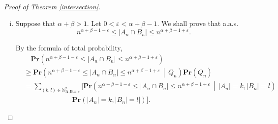 \documentclass[10pt,a4paper]{amsart}
\def\Pr{\mathbf{Pr}}
\newcommand{\bs}{\boldsymbol}
\newcommand\esp[1]{\mathbb{E}\left( #1 \right)}
\newcommand{\tendvers}{\xrightarrow[n\to\infty]{}}
\newcommand{\vide}{\textup{\O}}
\begin{document}
\begin{proof}[Proof of Theorem \ref{intersection}]
\begin{enumerate}[(i)]
        For any $(k,l)\in \mathbb{N}^2_{\bs A,\bs B, n, \varepsilon}$, by Lemma \ref{concentration uniform} (i)
        \[\begin{split}
        \esp{|A_n \cap B_n|\,\middle|\,|A_n|=k,|B_n| = l}
        & = \esp{|A_n \cap B_n|\,\middle|\,|A_n|=n^{\alpha'},|B_n| = n^{\beta'}}\\
        & \leq n^{\alpha'+\beta'-1} \leq n^{\alpha+\beta+2/3\varepsilon-1}\leq n^{-1/3\varepsilon}. 
        \end{split}\]
        Hence
        \[\Pr(A_n\cap B_n\neq\vide) \leq n^{-1/3\varepsilon}\Pr(Q_n)+\Pr(\overline{Q_n})\tendvers 0.\]
        
        \item Suppose that $\alpha+\beta>1$. Let $0<\varepsilon<\alpha+\beta-1$. We shall prove that a.a.s.
        \[n^{\alpha+\beta-1-\varepsilon}\leq|A_n\cap B_n|\leq n^{\alpha+\beta-1+\varepsilon}.\]

        By the formula of total probability,
        \[ \begin{split}&\quad \Pr(n^{\alpha+\beta-1-\varepsilon} \leq |A_n\cap B_n| \leq n^{\alpha+\beta-1+\varepsilon})\\
        & \geq \Pr\left(n^{\alpha+\beta-1-\varepsilon}\leq |A_n\cap B_n| \leq n^{\alpha+\beta-1+\varepsilon}\,\middle|\,Q_n\right)\Pr(Q_n)\\
        & = \sum_{(k,l)\in\mathbb{N}^2_{\bs A,\bs B, n, \varepsilon}} \Big[ \Pr\left(n^{\alpha+\beta-1-\varepsilon}\leq |A_n\cap B_n| \leq n^{\alpha+\beta-1+\varepsilon}\,\middle|\,|A_n|=k,|B_n| = l\right)\\
        &\qquad\qquad\qquad\quad\Pr(|A_n|=k,|B_n| = l|)\Big].
        \end{split}\]
        

\end{enumerate}
\end{proof}
\end{document}
